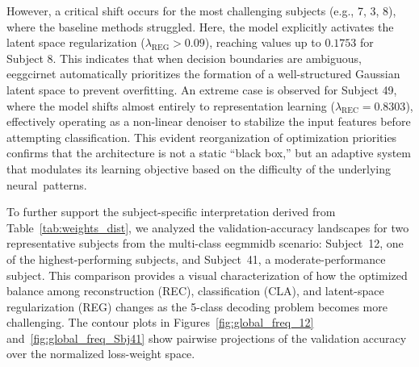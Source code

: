 However, a critical shift occurs for the most challenging subjects (e.g., 7, 3, 8), where the baseline methods struggled. Here, the model explicitly activates the latent space regularization ($\lambda_{\text{REG}} > 0.09$), reaching values up to $0.1753$ for Subject 8. This indicates that when decision boundaries are ambiguous, \gls{eeggcirnet} automatically prioritizes the formation of a well-structured Gaussian latent space to prevent overfitting. An extreme case is observed for Subject 49, where the model shifts almost entirely to representation learning ($\lambda_{\text{REC}} = 0.8303$), effectively operating as a non-linear denoiser to stabilize the input features before attempting classification. This evident reorganization of optimization priorities confirms that the architecture is not a static ``black box,'' but an adaptive system that modulates its learning objective based on the difficulty of the underlying \mbox{neural patterns.}


{To further support the subject-specific interpretation derived from Table~\ref{tab:weights_dist}, we analyzed the validation-accuracy landscapes for two representative subjects from the multi-class \gls{eegmmidb} scenario: Subject~12, one of the highest-performing subjects, and Subject~41, a moderate-performance subject. This comparison provides a visual characterization of how the optimized balance among reconstruction (REC), classification (CLA), and latent-space regularization (REG) changes as the 5-class decoding problem becomes more challenging. The contour plots in Figures~\ref{fig:global_freq_12} and~\ref{fig:global_freq_Sbj41} show pairwise projections of the validation accuracy over the normalized loss-weight space.}

